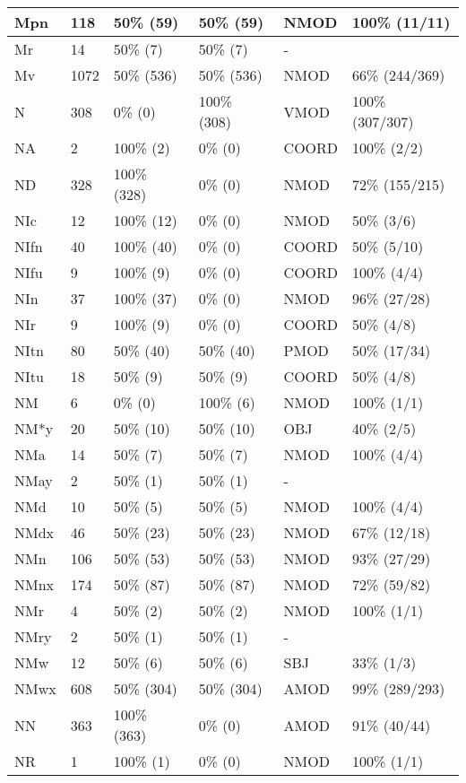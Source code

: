 \begin{figure*}
\begin{tabular}{|l|l|l|l||l|l|}
\hline
 Mpn & 118 & 50\% (59) & 50\% (59) & NMOD & 100\% (11/11) \\ 
\hline
 Mr & 14 & 50\% (7) & 50\% (7) & - &  \\ 
\hline
 Mv & 1072 & 50\% (536) & 50\% (536) & NMOD & 66\% (244/369) \\ 
\hline
 N & 308 & 0\% (0) & 100\% (308) & VMOD & 100\% (307/307) \\ 
\hline
 NA & 2 & 100\% (2) & 0\% (0) & COORD & 100\% (2/2) \\ 
\hline
 ND & 328 & 100\% (328) & 0\% (0) & NMOD & 72\% (155/215) \\ 
\hline
 NIc & 12 & 100\% (12) & 0\% (0) & NMOD & 50\% (3/6) \\ 
\hline
 NIfn & 40 & 100\% (40) & 0\% (0) & COORD & 50\% (5/10) \\ 
\hline
 NIfu & 9 & 100\% (9) & 0\% (0) & COORD & 100\% (4/4) \\ 
\hline
 NIn & 37 & 100\% (37) & 0\% (0) & NMOD & 96\% (27/28) \\ 
\hline
 NIr & 9 & 100\% (9) & 0\% (0) & COORD & 50\% (4/8) \\ 
\hline
 NItn & 80 & 50\% (40) & 50\% (40) & PMOD & 50\% (17/34) \\ 
\hline
 NItu & 18 & 50\% (9) & 50\% (9) & COORD & 50\% (4/8) \\ 
\hline
 NM & 6 & 0\% (0) & 100\% (6) & NMOD & 100\% (1/1) \\ 
\hline
 NM*y & 20 & 50\% (10) & 50\% (10) & OBJ & 40\% (2/5) \\ 
\hline
 NMa & 14 & 50\% (7) & 50\% (7) & NMOD & 100\% (4/4) \\ 
\hline
 NMay & 2 & 50\% (1) & 50\% (1) & - &  \\ 
\hline
 NMd & 10 & 50\% (5) & 50\% (5) & NMOD & 100\% (4/4) \\ 
\hline
 NMdx & 46 & 50\% (23) & 50\% (23) & NMOD & 67\% (12/18) \\ 
\hline
 NMn & 106 & 50\% (53) & 50\% (53) & NMOD & 93\% (27/29) \\ 
\hline
 NMnx & 174 & 50\% (87) & 50\% (87) & NMOD & 72\% (59/82) \\ 
\hline
 NMr & 4 & 50\% (2) & 50\% (2) & NMOD & 100\% (1/1) \\ 
\hline
 NMry & 2 & 50\% (1) & 50\% (1) & - &  \\ 
\hline
 NMw & 12 & 50\% (6) & 50\% (6) & SBJ & 33\% (1/3) \\ 
\hline
 NMwx & 608 & 50\% (304) & 50\% (304) & AMOD & 99\% (289/293) \\ 
\hline
 NN & 363 & 100\% (363) & 0\% (0) & AMOD & 91\% (40/44) \\ 
\hline
 NR & 1 & 100\% (1) & 0\% (0) & NMOD & 100\% (1/1) \\ 
\hline
\end{tabular}
\end{figure*}
